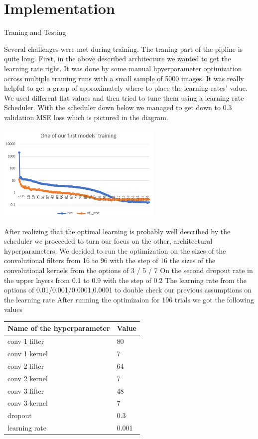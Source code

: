 \documentclass{article}
\begin{document}

\section*{Implementation}

Traning and Testing

Several challenges were met during training. The traning part of the pipline is quite long. First, in
the above described architecture we wanted to get the learning rate right. It was done by some
manual hpyerparameter optimization across multiple training runs with a small sample of 5000
images. It was really helpful to get a grasp of approximately where to place the learning rates’
value. We used different flat values and then tried to tune them using a learning rate Scheduler.
With the scheduler down below we managed to get down to 0.3 validation MSE loss which is
pictured in the diagram.

\includegraphics[width=300px]{diagram.png}

After realizing that the optimal
learning is probably well described
by the scheduler we proceeded to
turn our focus on the other,
architectural hyperparameters. We decided to run the optimization on
	the sizes of the convolutional filters from 16 to 96 with the step of 16
	the sizes of the convolutional kernels from the options of 3 / 5 / 7
	On the second dropout rate in the upper layers from 0.1 to 0.9 with the step of 0.2
	The learning rate from the options of 0.01/0.001/0.0001,0.0001 to double check our previous assumptions on the learning rate
After running the optimizaion for 196 trials we got the following values

\begin{center}
\begin{tabular}{ | m{15em} | m{3em}| }
  \hline
  Name of the hyperparameter & Value  \\
  \hline
  \hline
  conv 1 filter & 80  \\
  \hline
  conv 1 kernel & 7 \\
  \hline
    conv 2 filter  & 64 \\
  \hline
    conv 2 kernel & 7 \\
  \hline
    conv 3 filter  & 48 \\
  \hline
    conv 3 kernel & 7 \\
  \hline
    dropout & 0.3 \\
      \hline
    learning rate & 0.001 \\
    \hline
\end{tabular}
\end{center}
\end{document}
